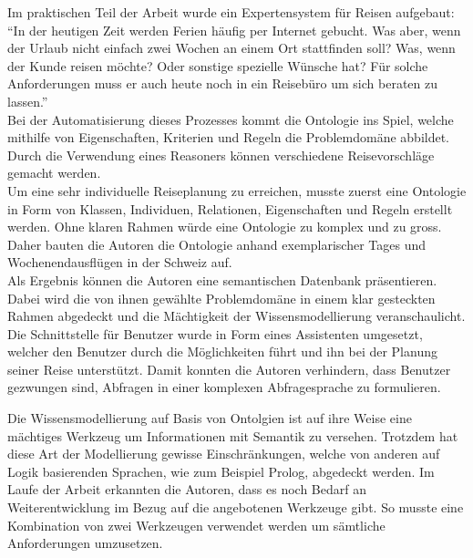 Im praktischen Teil der Arbeit wurde ein Expertensystem für Reisen aufgebaut: ``In der heutigen Zeit werden Ferien häufig per Internet gebucht. Was aber, wenn der Urlaub nicht einfach zwei Wochen an einem Ort stattfinden soll? Was, wenn der Kunde reisen möchte? Oder sonstige spezielle Wünsche hat? Für solche Anforderungen muss er auch heute noch in ein Reisebüro um sich beraten zu lassen.''\\
Bei der Automatisierung dieses Prozesses kommt die Ontologie ins Spiel, welche mithilfe von Eigenschaften, Kriterien und Regeln die Problemdomäne abbildet. Durch die Verwendung eines Reasoners können verschiedene Reisevorschläge gemacht werden.\\
Um eine sehr individuelle Reiseplanung zu erreichen, musste zuerst eine Ontologie in Form von Klassen, Individuen, Relationen, Eigenschaften und Regeln erstellt werden. Ohne klaren Rahmen würde eine Ontologie zu komplex und zu gross. Daher bauten die Autoren die Ontologie anhand exemplarischer Tages und Wochenendausflügen in der Schweiz auf.\\
Als Ergebnis können die Autoren eine semantischen Datenbank präsentieren. Dabei wird die von ihnen gewählte Problemdomäne in einem klar gesteckten Rahmen abgedeckt und die Mächtigkeit der Wissensmodellierung veranschaulicht. Die Schnittstelle für Benutzer wurde in Form eines Assistenten umgesetzt, welcher den Benutzer durch die Möglichkeiten führt und ihn bei der Planung seiner Reise unterstützt. Damit konnten die Autoren verhindern, dass Benutzer gezwungen sind, Abfragen in einer komplexen Abfragesprache zu formulieren.

Die Wissensmodellierung auf Basis von Ontolgien ist auf ihre Weise eine mächtiges Werkzeug um Informationen mit Semantik zu versehen. Trotzdem hat diese Art der Modellierung gewisse Einschränkungen, welche von anderen auf Logik basierenden Sprachen, wie zum Beispiel Prolog, abgedeckt werden. Im Laufe der Arbeit erkannten die Autoren, dass es noch Bedarf an Weiterentwicklung im Bezug auf die angebotenen Werkzeuge gibt. So musste eine Kombination von zwei Werkzeugen verwendet werden um sämtliche Anforderungen umzusetzen.


